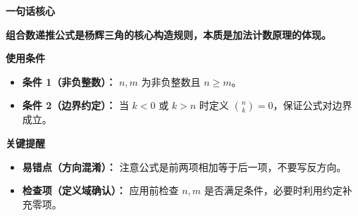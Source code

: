 \begin{summarybox}
	\textbf{\textcolor{CSummary}{一句话核心}}

	\textbf{组合数递推公式是杨辉三角的核心构造规则，本质是加法计数原理的体现。}

	\medskip
	\textbf{\textcolor{CSummary}{使用条件}}
	\begin{itemize}[leftmargin=*, itemsep=0.5em, topsep=0.4em]
		\item \textbf{条件 1（非负整数）：} $n,m$ 为非负整数且 $n\geq m$。
		\item \textbf{条件 2（边界约定）：} 当 $k<0$ 或 $k>n$ 时定义 $\binom{n}{k}=0$，保证公式对边界成立。
	\end{itemize}

	\medskip
	\textbf{\textcolor{CSummary}{关键提醒}}
	\begin{itemize}[leftmargin=*, itemsep=0.5em, topsep=0.4em]
		\item \textbf{易错点（方向混淆）：} 注意公式是前两项相加等于后一项，不要写反方向。
		\item \textbf{检查项（定义域确认）：} 应用前检查 $n,m$ 是否满足条件，必要时利用约定补充零项。
	\end{itemize}
\end{summarybox}
